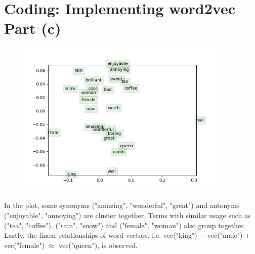 \documentclass{article}
\begin{document}
\pagebreak

\section{Coding: Implementing word2vec Part (c)}

\begin{figure}[h]
    \includegraphics[width=10cm]{word_vectors.png}
    \centering
\end{figure}

In the plot, some synonyms ("amazing", "wonderful", "great") and antonyms ("enjoyable", "annoying") are cluster together. Terms with similar usage such as ("tea", "coffee"), ("rain", "snow") and ("female", "woman") also group together. Lastly, the linear relationships of word vectors, i.e. vec("king") $-$ vec("male") + vec("female") $\approx$ vec("queen"), is observed.
\end{document}
